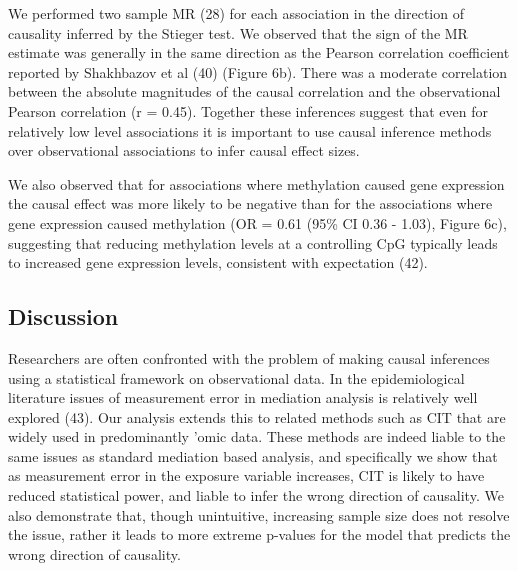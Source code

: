 \documentclass[]{article}
\begin{document}
We performed two sample MR (28) for each association in the direction of
causality inferred by the Stieger test. We observed that the sign of the
MR estimate was generally in the same direction as the Pearson
correlation coefficient reported by Shakhbazov et al (40) (Figure 6b).
There was a moderate correlation between the absolute magnitudes of the
causal correlation and the observational Pearson correlation (r = 0.45).
Together these inferences suggest that even for relatively low level
associations it is important to use causal inference methods over
observational associations to infer causal effect sizes.

We also observed that for associations where methylation caused gene
expression the causal effect was more likely to be negative than for the
associations where gene expression caused methylation (OR = 0.61 (95\%
CI 0.36 - 1.03), Figure 6c), suggesting that reducing methylation levels
at a controlling CpG typically leads to increased gene expression
levels, consistent with expectation (42).

\subsection{Discussion}\label{discussion}

Researchers are often confronted with the problem of making causal
inferences using a statistical framework on observational data. In the
epidemiological literature issues of measurement error in mediation
analysis is relatively well explored (43). Our analysis extends this to
related methods such as CIT that are widely used in predominantly 'omic
data. These methods are indeed liable to the same issues as standard
mediation based analysis, and specifically we show that as measurement
error in the exposure variable increases, CIT is likely to have reduced
statistical power, and liable to infer the wrong direction of causality.
We also demonstrate that, though unintuitive, increasing sample size
does not resolve the issue, rather it leads to more extreme p-values for
the model that predicts the wrong direction of causality.
\end{document}

